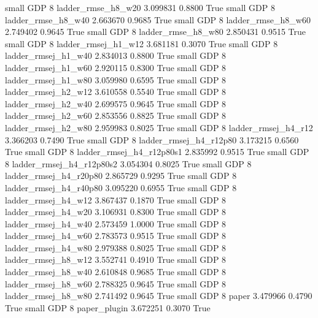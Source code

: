      small      GDP                 8       ladder_rmse_h8_w20   3.099831      0.8800    True
     small      GDP                 8       ladder_rmse_h8_w40   2.663670      0.9685    True
     small      GDP                 8       ladder_rmse_h8_w60   2.749402      0.9645    True
     small      GDP                 8       ladder_rmse_h8_w80   2.850431      0.9515    True
     small      GDP                 8      ladder_rmsej_h1_w12   3.681181      0.3070    True
     small      GDP                 8      ladder_rmsej_h1_w40   2.834013      0.8800    True
     small      GDP                 8      ladder_rmsej_h1_w60   2.920115      0.8300    True
     small      GDP                 8      ladder_rmsej_h1_w80   3.059980      0.6595    True
     small      GDP                 8      ladder_rmsej_h2_w12   3.610558      0.5540    True
     small      GDP                 8      ladder_rmsej_h2_w40   2.699575      0.9645    True
     small      GDP                 8      ladder_rmsej_h2_w60   2.853556      0.8825    True
     small      GDP                 8      ladder_rmsej_h2_w80   2.959983      0.8025    True
     small      GDP                 8      ladder_rmsej_h4_r12   3.366203      0.7490    True
     small      GDP                 8   ladder_rmsej_h4_r12p80   3.173215      0.6560    True
     small      GDP                 8 ladder_rmsej_h4_r12p80s1   2.835992      0.9515    True
     small      GDP                 8 ladder_rmsej_h4_r12p80s2   3.054304      0.8025    True
     small      GDP                 8   ladder_rmsej_h4_r20p80   2.865729      0.9295    True
     small      GDP                 8   ladder_rmsej_h4_r40p80   3.095220      0.6955    True
     small      GDP                 8      ladder_rmsej_h4_w12   3.867437      0.1870    True
     small      GDP                 8      ladder_rmsej_h4_w20   3.106931      0.8300    True
     small      GDP                 8      ladder_rmsej_h4_w40   2.573459      1.0000    True
     small      GDP                 8      ladder_rmsej_h4_w60   2.783573      0.9515    True
     small      GDP                 8      ladder_rmsej_h4_w80   2.979388      0.8025    True
     small      GDP                 8      ladder_rmsej_h8_w12   3.552741      0.4910    True
     small      GDP                 8      ladder_rmsej_h8_w40   2.610848      0.9685    True
     small      GDP                 8      ladder_rmsej_h8_w60   2.788325      0.9645    True
     small      GDP                 8      ladder_rmsej_h8_w80   2.741492      0.9645    True
     small      GDP                 8                    paper   3.479966      0.4790    True
     small      GDP                 8             paper_plugin   3.672251      0.3070    True
